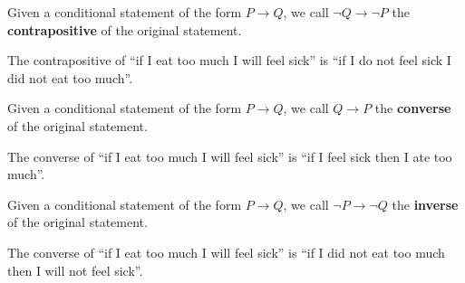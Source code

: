 \documentclass[]{article}
\begin{document}
\begin{defn}[Contrapositive] Given a conditional statement of the form $P \rightarrow Q$, we call $\neg Q \rightarrow \neg P$ the \textbf{contrapositive} of the original statement. 
\end{defn}
\begin{exmp} The contrapositive of ``if I eat too much I will feel sick'' is ``if I do not feel sick I did not eat too much''.
\end{exmp}
\begin{defn}[Converse] Given a conditional statement of the form $P \rightarrow Q$, we call $Q \rightarrow P$ the \textbf{converse} of the original statement. 
\begin{exmp} The converse of ``if I eat too much I will feel sick'' is ``if I feel sick then I ate too much''.
\end{exmp}
\end{defn}
\begin{defn}[Inverse ] Given a conditional statement of the form $P \rightarrow Q$, we call $\neg P\rightarrow \neg Q$ the \textbf{inverse} of the original statement.
\end{defn}	
\begin{exmp} The converse of ``if I eat too much I will feel sick'' is ``if I did not eat too much then I will not feel sick''.
\end{exmp}
\end{document}

